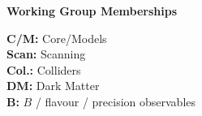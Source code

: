 \newpage
\centerline{\textbf{Working Group Memberships}}\bigskip

\noindent\textbf{C/M:} Core/Models\\
\noindent\textbf{Scan:} Scanning\\
\noindent\textbf{Col.:} Colliders\\
\noindent\textbf{DM:} Dark Matter\\
\noindent\textbf{B:} $B$ / flavour / precision observables

\bigskip

\newcommand{\C}{\textbf{C}}            %
\newcommand{\M}{$\bullet$}             %
\newlength{\Mwidth} \settowidth{\Mwidth}{\M}
\newcommand{\E}{\makebox[\Mwidth]{}}   %
